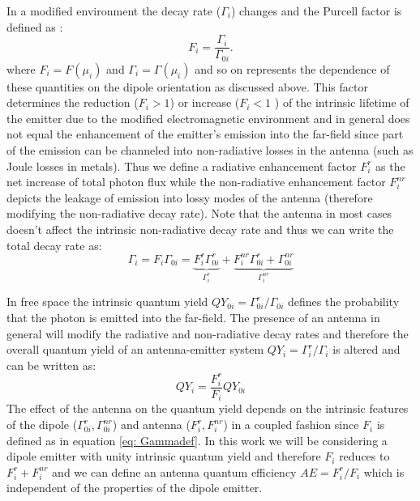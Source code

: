 \documentclass[10pt,onecolumn ]{article}
\begin{document}
In a modified environment the decay rate ($\Gamma_i$) changes and the Purcell factor is defined as \cite{Purcell1946SpontaneousFrequencies}:
\begin{equation}
\label{eq: Purcell}
F_i=\frac{\Gamma_i}{\Gamma_{0i}}.
\end{equation}
where $F_i =F(\mu_i)$ and $\Gamma_i=\Gamma(\mu_i)$ and so on represents the dependence of these quantities on the dipole orientation as discussed above.
This factor determines the reduction ($F_i>1$) or increase ($F_i<1$ ) of the intrinsic lifetime of the emitter due to the modified electromagnetic environment and in general does not equal the enhancement of the emitter's emission into the far-field since part of the emission can be channeled into non-radiative losses in the antenna (such as Joule losses in metals). 
Thus we define a radiative enhancement factor $F^r_i$ as the net increase of total photon flux while the non-radiative enhancement factor $F^{nr}_i$ depicts the leakage of emission into lossy modes of the antenna (therefore modifying the non-radiative decay rate). 
Note that the antenna in most cases doesn't affect the intrinsic non-radiative decay rate and thus we can write the total decay rate as: 
\begin{equation}
\label{eq: Gammadef}
\Gamma_i=F_i\Gamma_{0i} = \underbrace{F^r_i \Gamma_{0i}^r}_{\Gamma_i^r} +\underbrace{F^{nr}_i \Gamma_{0i}^{r}+\Gamma_{0i}^{nr}}_{\Gamma_i^{nr}}
\end{equation}

In free space the intrinsic quantum yield $QY_{0i} =\Gamma_{0i}^r/\Gamma_{0i}$ defines the probability that the photon is emitted into the far-field. 
The presence of an antenna in general will modify the radiative and non-radiative decay rates and therefore the overall quantum yield of an antenna-emitter system $QY_i=\Gamma_i^r/\Gamma_i$  is altered and can be written as: 
\begin{equation}
\label{eq:QY}
QY_i=\frac{F^r_i}{F_i}QY_{0i}
\end{equation}
The effect of the antenna on the quantum yield depends on the intrinsic features of the dipole ($\Gamma^r_{0i},\Gamma^{nr}_{0i}$) and antenna ($F^r_i,F^{nr}_i$) in a coupled fashion since $F_i$ is defined as in equation \ref{eq: Gammadef}.
In this work we will be considering a dipole emitter with unity intrinsic quantum yield and therefore $F_i$ reduces to $F_i^r+F_i^{nr}$ and we can define an antenna quantum efficiency $AE=F^r_i/F_i$ which is independent of the properties of the dipole emitter.  
\end{document}
